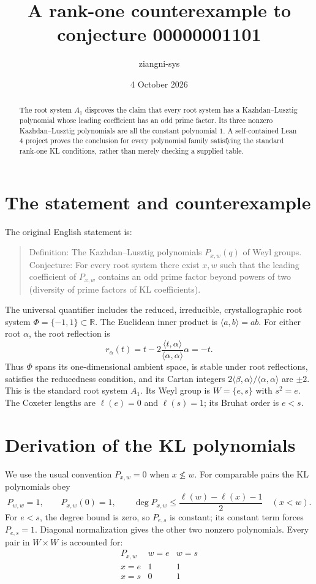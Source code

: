 \documentclass[11pt]{article}
\title{A rank-one counterexample to conjecture 00000001101}
\author{ziangni-sys}
\date{4 October 2026}
\begin{document}
\maketitle
\begin{abstract}
The root system $A_1$ disproves the claim that every root system has a
Kazhdan--Lusztig polynomial whose leading coefficient has an odd prime factor.
Its three nonzero Kazhdan--Lusztig polynomials are all the constant polynomial
$1$. A self-contained Lean 4 project proves the conclusion for every
polynomial family satisfying the standard rank-one KL conditions, rather
than merely checking a supplied table.
\end{abstract}

\section{The statement and counterexample}
The original English statement is:
\begin{quote}
Definition: The Kazhdan--Lusztig polynomials $P_{x,w}(q)$ of Weyl groups.
Conjecture: For every root system there exist $x,w$ such that the leading
coefficient of $P_{x,w}$ contains an odd prime factor beyond powers of two
(diversity of prime factors of KL coefficients).
\end{quote}
The universal quantifier includes the reduced, irreducible, crystallographic
root system $\Phi=\{-1,1\}\subset\mathbb R$. The Euclidean inner product
is $\langle a,b\rangle=ab$. For either root $\alpha$, the root reflection
is
\[
r_\alpha(t)=t-2\frac{\langle t,\alpha\rangle}{\langle\alpha,\alpha\rangle}
\alpha=-t.
\]
Thus $\Phi$ spans its one-dimensional ambient space, is stable under
root reflections, satisfies the reducedness condition, and its Cartan
integers $2\langle\beta,\alpha\rangle/\langle\alpha,\alpha\rangle$
are $\pm2$. This is the standard root system $A_1$. Its Weyl group is
$W=\{e,s\}$ with $s^2=e$. The Coxeter lengths are $\ell(e)=0$ and
$\ell(s)=1$; its Bruhat order is $e<s$.

\section{Derivation of the KL polynomials}
We use the usual convention $P_{x,w}=0$ when $x\not\leq w$. For comparable
pairs the KL polynomials obey
\[
P_{w,w}=1,\qquad P_{x,w}(0)=1,\qquad
\deg P_{x,w}\leq\frac{\ell(w)-\ell(x)-1}{2}\quad(x<w).
\]
For $e<s$, the degree bound is zero, so $P_{e,s}$ is constant;
its constant term forces $P_{e,s}=1$. Diagonal normalization gives the
other two nonzero polynomials. Every pair in $W\times W$ is accounted for:
\[
\begin{array}{c|cc}
P_{x,w}&w=e&w=s\\\hline
x=e&1&1\\
x=s&0&1
\end{array}
\]
\end{document}
